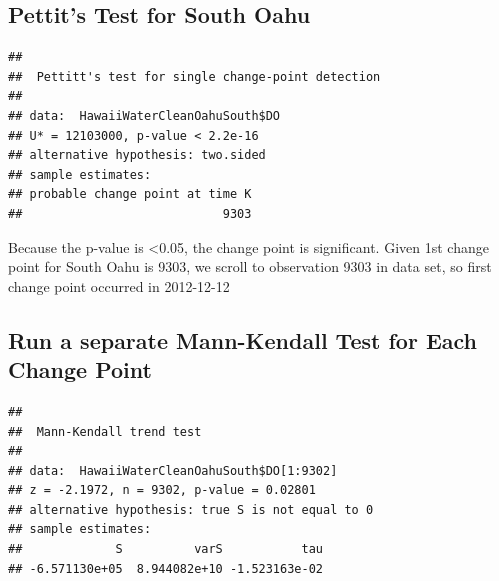 \documentclass[12pt,]{article}
\newenvironment{Shaded}{\begin{snugshade}}{\end{snugshade}}
\newcommand{\KeywordTok}[1]{\textcolor[rgb]{0.13,0.29,0.53}{\textbf{#1}}}
\newcommand{\DecValTok}[1]{\textcolor[rgb]{0.00,0.00,0.81}{#1}}
\newcommand{\OperatorTok}[1]{\textcolor[rgb]{0.81,0.36,0.00}{\textbf{#1}}}
\newcommand{\NormalTok}[1]{#1}
\begin{document}
\subsection{Pettit's Test for South
Oahu}\label{pettits-test-for-south-oahu}

\begin{Shaded}
\end{Shaded}

\begin{verbatim}
## 
##  Pettitt's test for single change-point detection
## 
## data:  HawaiiWaterCleanOahuSouth$DO
## U* = 12103000, p-value < 2.2e-16
## alternative hypothesis: two.sided
## sample estimates:
## probable change point at time K 
##                            9303
\end{verbatim}

Because the p-value is \textless{}0.05, the change point is significant.
Given 1st change point for South Oahu is 9303, we scroll to observation
9303 in data set, so first change point occurred in 2012-12-12

\subsection{Run a separate Mann-Kendall Test for Each Change
Point}\label{run-a-separate-mann-kendall-test-for-each-change-point-1}

\begin{Shaded}
\end{Shaded}

\begin{verbatim}
## 
##  Mann-Kendall trend test
## 
## data:  HawaiiWaterCleanOahuSouth$DO[1:9302]
## z = -2.1972, n = 9302, p-value = 0.02801
## alternative hypothesis: true S is not equal to 0
## sample estimates:
##             S          varS           tau 
## -6.571130e+05  8.944082e+10 -1.523163e-02
\end{verbatim}

\begin{Shaded}
\end{Shaded}
\end{document}
